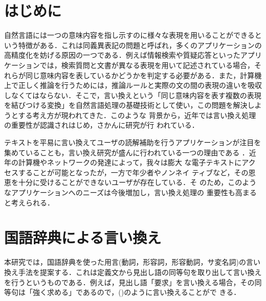 
\def\tr#1#2#3{}

\def\rsk#1#2#3{}
\def\myline#1#2{}

\addtocounter{paractr}{1}
\newcommand{\para}[2]{}




\maketitle
\thispagestyle{empty}


\section{はじめに}

自然言語には一つの意味内容を指し示すのに様々な表現を用いることができると
いう特徴がある．これは同義異表記の問題と呼ばれ，多くのアプリケーションの
高精度化を妨げる原因の一つである．例えば情報検索や質疑応答といったアプリ
ケーションでは，検索質問と文書が異なる表現を用いて記述されている場合，そ
れらが同じ意味内容を表しているかどうかを判定する必要がある．また，計算機
上で正しく推論を行うためには，推論ルールと実際の文の間の表現の違いを吸収
しなくてはならない．そこで，言い換えという「同じ意味内容を表す複数の表現
を結びつける変換」を自然言語処理の基礎技術として使い，この問題を解決しよ
うとする考え方が現われてきた\cite{Sato99,Sato01,Kurohashi01}．このような
背景から，近年では言い換え処理の重要性が認識されはじめ，さかんに研究が行
われている．

テキストを平易に言い換えてユーザの読解補助を行うアプリケーションが注目を
集めていることも，言い換え研究が盛んに行われている一つの理由である
\cite{Takahashi01}．近年の計算機やネットワークの発達によって，我々は膨大
な電子テキストにアクセスすることが可能となったが，一方で年少者やノンネイ
ティブなど，その恩恵を十分に受けることができないユーザが存在している．そ
のため，このようなアプリケーションへのニーズは今後増加し，言い換え処理の
重要性も高まると考えられる．


\section{国語辞典による言い換え}

本研究では，国語辞典を使った用言(動詞，形容詞，形容動詞，サ変名詞)の言い
換え手法を提案する．これは定義文から見出し語の同等句を取り出して言い換え
を行うというものである．例えば，見出し語「要求」を言い換える場合，その同
等句は「強く求める」であるので，(\theparactr)のように言い換えることがで
きる．

